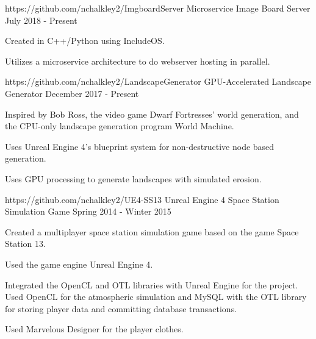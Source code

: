 

\begin{cventries}

  \cventry
    {https://github.com/nchalkley2/ImgboardServer} %
	{Microservice Image Board Server} %
    {} %
    {July 2018 - Present} %
    {
      \begin{cvitems} %
        \item {Created in C++/Python using IncludeOS.}
		\item {Utilizes a microservice architecture to do webserver hosting in parallel.}
      \end{cvitems}
    }
  \cventry
    {https://github.com/nchalkley2/LandscapeGenerator} %
	{GPU-Accelerated Landscape Generator} %
    {} %
    {December 2017 - Present} %
    {
      \begin{cvitems} %
        \item {Inspired by Bob Ross, the video game Dwarf Fortresses' world generation, and the CPU-only landscape generation program World Machine.}
		\item {Uses Unreal Engine 4's blueprint system for non-destructive node based generation.}
		\item {Uses GPU processing to generate landscapes with simulated erosion.}
      \end{cvitems}
    }

  \cventry
    {https://github.com/nchalkley2/UE4-SS13} %
	{Unreal Engine 4 Space Station Simulation Game} %
    {} %
    {Spring 2014 - Winter 2015} %
    {
      \begin{cvitems} %
	  	\item {Created a multiplayer space station simulation game based on the game Space Station 13.}
		\item {Used the game engine Unreal Engine 4.}
		\item {Integrated the OpenCL and OTL libraries with Unreal Engine for the project. Used OpenCL for the atmospheric simulation and MySQL with the OTL library for storing player data and committing database transactions.}
		\item {Used Marvelous Designer for the player clothes.}
      \end{cvitems}
    }
\end{cventries}
